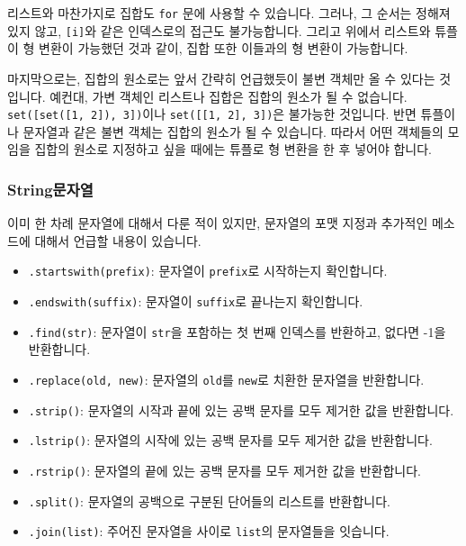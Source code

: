 \documentclass[../main.tex]{subfiles}
\begin{document}
리스트와 마찬가지로 집합도 \texttt{for} 문에 사용할 수 있습니다.
그러나, 그 순서는 정해져 있지 않고, \texttt{[i]}와 같은 인덱스로의 접근도 불가능합니다.
그리고 위에서 리스트와 튜플이 형 변환이 가능했던 것과 같이, 집합 또한 이들과의 형 변환이 가능합니다.

마지막으로는, 집합의 원소로는 앞서 간략히 언급했듯이 불변 객체만 올 수 있다는 것입니다.
예컨대, 가변 객체인 리스트나 집합은 집합의 원소가 될 수 없습니다.
\texttt{set([set([1, 2]), 3])}이나 \texttt{set([[1, 2], 3])}은 불가능한 것입니다.
반면 튜플이나 문자열과 같은 불변 객체는 집합의 원소가 될 수 있습니다.
따라서 어떤 객체들의 모임을 집합의 원소로 지정하고 싶을 때에는 튜플로 형 변환을 한 후 넣어야 합니다.

\subsubsection{String문자열}
이미 한 차례 문자열에 대해서 다룬 적이 있지만, 문자열의 포맷 지정과 추가적인 메소드에 대해서 언급할 내용이 있습니다.
\begin{itemize}
    \item \texttt{.startswith(prefix)}: 문자열이 \texttt{prefix}로 시작하는지 확인합니다.
    \item \texttt{.endswith(suffix)}: 문자열이 \texttt{suffix}로 끝나는지 확인합니다.
    \item \texttt{.find(str)}: 문자열이 \texttt{str}을 포함하는 첫 번째 인덱스를 반환하고, 없다면 -1을 반환합니다.
    \item \texttt{.replace(old, new)}: 문자열의 \texttt{old}를 \texttt{new}로 치환한 문자열을 반환합니다.
    \item \texttt{.strip()}: 문자열의 시작과 끝에 있는 공백 문자를 모두 제거한 값을 반환합니다.
    \item \texttt{.lstrip()}: 문자열의 시작에 있는 공백 문자를 모두 제거한 값을 반환합니다.
    \item \texttt{.rstrip()}: 문자열의 끝에 있는 공백 문자를 모두 제거한 값을 반환합니다.
    \item \texttt{.split()}: 문자열의 공백으로 구분된 단어들의 리스트를 반환합니다.
    \item \texttt{.join(list)}: 주어진 문자열을 사이로 \texttt{list}의 문자열들을 잇습니다.
\end{itemize}
\end{document}
